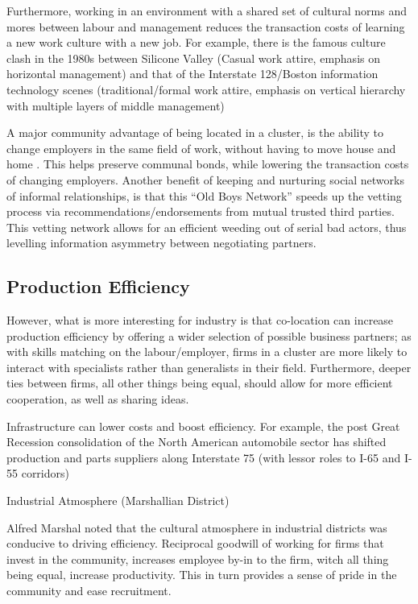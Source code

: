 \documentclass[12pt,letterpaper,notitlepage,onecolumn,final,openbib]{article}
\begin{document}
	Furthermore, working in an environment with a shared set of cultural norms and mores between labour and management reduces the transaction costs of learning a new work culture with a new job.  For example, there is the famous culture clash in the 1980s between Silicone Valley (Casual work attire, emphasis on horizontal management) and that of the Interstate 128/Boston information technology scenes (traditional/formal work attire, emphasis on vertical hierarchy with multiple layers of middle management)
	
	A major community advantage of being located in a cluster, is the ability to change employers in the same field of work, without having to move house and home \cite{HicklingArthursLow2009}.  This helps preserve communal bonds, while lowering the transaction costs of changing employers.  Another benefit of keeping and nurturing social networks of informal relationships, is that this ``Old Boys Network'' speeds up the vetting process via recommendations/endorsements from mutual trusted third parties.  This vetting network allows for an efficient weeding out of serial bad actors, thus levelling information asymmetry between negotiating partners.  
	
	\subsection{Production Efficiency}
	
	
	However, what is more interesting for industry is that co-location can increase production efficiency by offering a wider selection of possible business partners; as with skills matching on the labour/employer, firms in a cluster are more likely to interact with specialists rather than generalists in their field.  
	Furthermore, deeper ties between firms, all other things being equal, should allow for more efficient cooperation, as well as sharing ideas.   
	
	Infrastructure can lower costs and boost efficiency.  For example, the post Great Recession consolidation of the North American automobile sector has shifted production and parts suppliers along Interstate 75 (with lessor roles to I-65 and I-55 corridors)\cite{Cuneo2014}  
	
	Industrial Atmosphere (Marshallian District)
	
	Alfred Marshal noted that the cultural atmosphere in industrial districts was conducive to driving efficiency.  Reciprocal goodwill of working for firms that invest in the community, increases employee by-in to the firm, witch all thing being equal, increase productivity. This in turn provides a sense of pride in the community and ease recruitment.   
	
\end{document}
